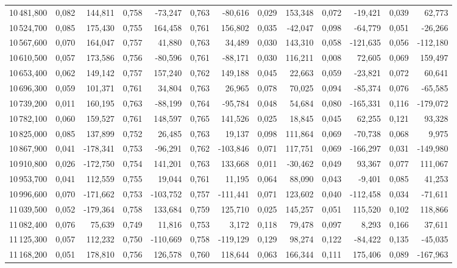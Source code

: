 \begin{longtable}{rrrrrrrrrrrrr}
10\,481,800 & 0,082 & 144,811 & 0,758 & -73,247 & 0,763 & -80,616 & 0,029 & 153,348 & 0,072 & -19,421 & 0,039 & 62,773\\
10\,524,700 & 0,085 & 175,430 & 0,755 & 164,458 & 0,761 & 156,802 & 0,035 & -42,047 & 0,098 & -64,779 & 0,051 & -26,266\\
10\,567,600 & 0,070 & 164,047 & 0,757 & 41,880 & 0,763 & 34,489 & 0,030 & 143,310 & 0,058 & -121,635 & 0,056 & -112,180\\
10\,610,500 & 0,057 & 173,586 & 0,756 & -80,596 & 0,761 & -88,171 & 0,030 & 116,211 & 0,008 & 72,605 & 0,069 & 159,497\\
10\,653,400 & 0,062 & 149,142 & 0,757 & 157,240 & 0,762 & 149,188 & 0,045 & 22,663 & 0,059 & -23,821 & 0,072 & 60,641\\
10\,696,300 & 0,059 & 101,371 & 0,761 & 34,804 & 0,763 & 26,965 & 0,078 & 70,025 & 0,094 & -85,374 & 0,076 & -65,585\\
10\,739,200 & 0,011 & 160,195 & 0,763 & -88,199 & 0,764 & -95,784 & 0,048 & 54,684 & 0,080 & -165,331 & 0,116 & -179,072\\
10\,782,100 & 0,060 & 159,527 & 0,761 & 148,597 & 0,765 & 141,526 & 0,025 & 18,845 & 0,045 & 62,255 & 0,121 & 93,328\\
10\,825,000 & 0,085 & 137,899 & 0,752 & 26,485 & 0,763 & 19,137 & 0,098 & 111,864 & 0,069 & -70,738 & 0,068 & 9,975\\
10\,867,900 & 0,041 & -178,341 & 0,753 & -96,291 & 0,762 & -103,846 & 0,071 & 117,751 & 0,069 & -166,297 & 0,031 & -149,980\\
10\,910,800 & 0,026 & -172,750 & 0,754 & 141,201 & 0,763 & 133,668 & 0,011 & -30,462 & 0,049 & 93,367 & 0,077 & 111,067\\
10\,953,700 & 0,041 & 112,559 & 0,755 & 19,044 & 0,761 & 11,195 & 0,064 & 88,090 & 0,043 & -9,401 & 0,085 & 41,253\\
10\,996,600 & 0,070 & -171,662 & 0,753 & -103,752 & 0,757 & -111,441 & 0,071 & 123,602 & 0,040 & -112,458 & 0,034 & -71,611\\
11\,039,500 & 0,052 & -179,364 & 0,758 & 133,684 & 0,759 & 125,710 & 0,025 & 145,257 & 0,051 & 115,520 & 0,102 & 118,866\\
11\,082,400 & 0,076 & 75,639 & 0,749 & 11,816 & 0,753 & 3,172 & 0,118 & 79,478 & 0,097 & 8,293 & 0,166 & 37,611\\
11\,125,300 & 0,057 & 112,232 & 0,750 & -110,669 & 0,758 & -119,129 & 0,129 & 98,274 & 0,122 & -84,422 & 0,135 & -45,035\\
11\,168,200 & 0,051 & 178,810 & 0,756 & 126,578 & 0,760 & 118,644 & 0,063 & 166,344 & 0,111 & 175,406 & 0,089 & -167,963\\

\end{longtable}
